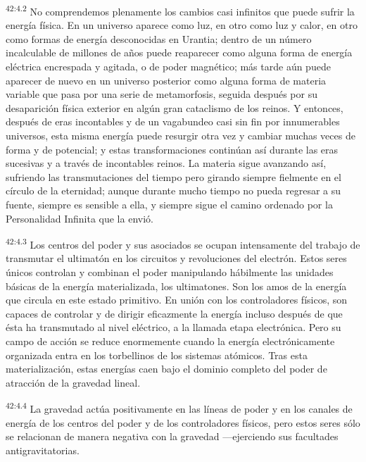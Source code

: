 \par
\textsuperscript{42:4.2} No comprendemos plenamente los cambios casi infinitos que puede sufrir la energía física. En un universo aparece como luz, en otro como luz y calor, en otro como formas de energía desconocidas en Urantia; dentro de un número incalculable de millones de años puede reaparecer como alguna forma de energía eléctrica encrespada y agitada, o de poder magnético; más tarde aún puede aparecer de nuevo en un universo posterior como alguna forma de materia variable que pasa por una serie de metamorfosis, seguida después por su desaparición física exterior en algún gran cataclismo de los reinos. Y entonces, después de eras incontables y de un vagabundeo casi sin fin por innumerables universos, esta misma energía puede resurgir otra vez y cambiar muchas veces de forma y de potencial; y estas transformaciones continúan así durante las eras sucesivas y a través de incontables reinos. La materia sigue avanzando así, sufriendo las transmutaciones del tiempo pero girando siempre fielmente en el círculo de la eternidad; aunque durante mucho tiempo no pueda regresar a su fuente, siempre es sensible a ella, y siempre sigue el camino ordenado por la Personalidad Infinita que la envió.

\par
\textsuperscript{42:4.3} Los centros del poder y sus asociados se ocupan intensamente del trabajo de transmutar el ultimatón en los circuitos y revoluciones del electrón. Estos seres únicos controlan y combinan el poder manipulando hábilmente las unidades básicas de la energía materializada, los ultimatones. Son los amos de la energía que circula en este estado primitivo. En unión con los controladores físicos, son capaces de controlar y de dirigir eficazmente la energía incluso después de que ésta ha transmutado al nivel eléctrico, a la llamada etapa electrónica. Pero su campo de acción se reduce enormemente cuando la energía electrónicamente organizada entra en los torbellinos de los sistemas atómicos. Tras esta materialización, estas energías caen bajo el dominio completo del poder de atracción de la gravedad lineal.

\par
\textsuperscript{42:4.4} La gravedad actúa positivamente en las líneas de poder y en los canales de energía de los centros del poder y de los controladores físicos, pero estos seres sólo se relacionan de manera negativa con la gravedad ---ejerciendo sus facultades antigravitatorias.

